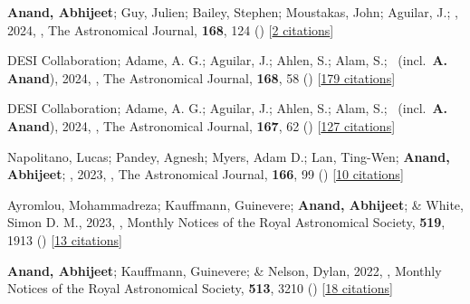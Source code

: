 \item[{\color{numcolor}\scriptsize8}] \textbf{Anand, Abhijeet}; Guy, Julien; Bailey, Stephen; Moustakas, John; Aguilar, J.; \etal, 2024, , The Astronomical Journal, \textbf{168}, 124 () [\href{https://ui.adsabs.harvard.edu/abs/2024AJ....168..124A}{2 citations}]

\item[{\color{numcolor}\scriptsize7}] DESI Collaboration; Adame, A. G.; Aguilar, J.; Ahlen, S.; Alam, S.; \etal\ (incl.\ \textbf{A. Anand}), 2024, , The Astronomical Journal, \textbf{168}, 58 () [\href{https://ui.adsabs.harvard.edu/abs/2024AJ....168...58D}{179 citations}]

\item[{\color{numcolor}\scriptsize6}] DESI Collaboration; Adame, A. G.; Aguilar, J.; Ahlen, S.; Alam, S.; \etal\ (incl.\ \textbf{A. Anand}), 2024, , The Astronomical Journal, \textbf{167}, 62 () [\href{https://ui.adsabs.harvard.edu/abs/2024AJ....167...62D}{127 citations}]

\item[{\color{numcolor}\scriptsize5}] Napolitano, Lucas; Pandey, Agnesh; Myers, Adam D.; Lan, Ting-Wen; \textbf{Anand, Abhijeet}; \etal, 2023, , The Astronomical Journal, \textbf{166}, 99 () [\href{https://ui.adsabs.harvard.edu/abs/2023AJ....166...99N}{10 citations}]

\item[{\color{numcolor}\scriptsize4}] Ayromlou, Mohammadreza; Kauffmann, Guinevere; \textbf{Anand, Abhijeet}; \& White, Simon D. M., 2023, , Monthly Notices of the Royal Astronomical Society, \textbf{519}, 1913 () [\href{https://ui.adsabs.harvard.edu/abs/2023MNRAS.519.1913A}{13 citations}]

\item[{\color{numcolor}\scriptsize3}] \textbf{Anand, Abhijeet}; Kauffmann, Guinevere; \& Nelson, Dylan, 2022, , Monthly Notices of the Royal Astronomical Society, \textbf{513}, 3210 () [\href{https://ui.adsabs.harvard.edu/abs/2022MNRAS.513.3210A}{18 citations}]


